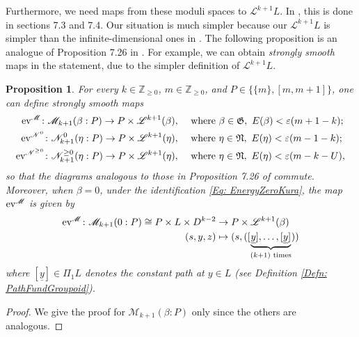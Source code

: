 \documentclass[10pt]{amsart}
\numberwithin{equation}{section}
\theoremstyle{plain}
\newtheorem{proposition}[theorem]{Proposition}
\theoremstyle{definition}
\theoremstyle{remark}
\numberwithin{equation}{section}
\newcommand{\Z}{\mathbb{Z}}
\newcommand{\ev}{\textup{ev}}
\newcommand{\ms}[1]{\mathscr{#1}}
\begin{document}
{Furthermore, we need maps from these moduli spaces to $\mathscr{L}^{k+1}L$. In \cite{Irie2}, this is done in sections 7.3 and 7.4. Our situation is much simpler because our $\mathscr{L}^{k+1} L$ is simpler than the infinite-dimensional ones in \cite{Irie2}.
The following proposition is an analogue of Proposition 7.26 in \cite{Irie2}.
For example, we can obtain \emph{strongly smooth} maps in the statement, due to the simpler definition of $\mathscr{L}^{k+1} L$.
\begin{proposition}\label{Prop: KuraStrSmMap}
	For every $k\in \Z_{\geq 0}$, $m\in \Z_{\geq 0}$, and $P\in \{\{m\}, [m,m+1]\}$, one can define strongly smooth maps 
	\begin{align*}
			\ev^\mathscr{M}\colon \mathscr{M}_{k+1}(\beta:P) \to P\times \mathscr{L}^{k+1}(\beta),\quad &\textup{ where }\beta \in \mathfrak{G}, \,\,E(\beta) < \varepsilon(m+1-k) ;\\
			 \ev^{\mathscr{N}^0}\colon \mathscr{N}_{k+1}^0(\eta: P) \to P\times \mathscr{L}^{k+1}(\eta), \quad &\textup{ where }\eta \in \mathfrak{N}, \,\, E(\eta) < \varepsilon(m-1-k);\\
			 \ev^{\mathscr{N}^{\geq 0}}\colon \mathscr{N}^{\geq 0}_{k+1}(\eta: P) \to P\times \mathscr{L}^{k+1}(\eta), \quad &\textup{ where }\eta \in \mathfrak{N}, \,\, E(\eta) < \varepsilon(m-k-U),
	\end{align*}
	so that the diagrams analogous to those in Proposition 7.26 of \cite{Irie2} commute.
	Moreover, when $\beta=0$, under the identification \eqref{Eq: EnergyZeroKura}, the map $\ev^{\ms{M}}$ is given by \begin{align}\label{Eq: EvEnergyZero}
		\ev^\ms{M}\colon \ms{M}_{k+1}(0:P)\cong P\times L \times D^{k-2} &\to P\times \ms{L}^{k+1}(\beta)\\
		(s, y, z) &\mapsto(s, ([\underbrace{\underline{y}],\dots, [\underline{y}]}_{(k+1) \textup{ times}}))\nonumber
	\end{align} 
	where $[\underline{y}]\in \Pi_1 L$ denotes the constant path at $y\in L$ (see Definition \ref{Defn: PathFundGroupoid}).
\end{proposition}

\begin{proof}
	We give the proof for $\ms{M}_{k+1}(\beta:P)$ only since the others are analogous.
	

\end{proof}}
\end{document}
